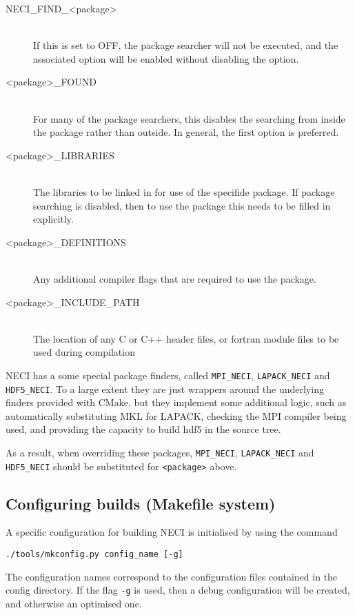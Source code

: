 \documentclass[a4paper,notitlepage]{scrreprt}
\newcommand\codeitem[1]{\needspace{1.5\baselineskip}\item[\textnormal{\ttfamily #1 \nopagebreak}] \hfill \\ \nopagebreak}
\let\code\lstinline
\begin{document}
    \begin{description}
        \codeitem{NECI\_FIND\_<package>}
            If this is set to OFF, the package searcher will not be executed, and the associated
            option will be enabled without disabling the option.
        \codeitem{<package>\_FOUND}
            For many of the package searchers, this disables the searching from inside the package
            rather than outside. In general, the first option is preferred.
        \codeitem{<package>\_LIBRARIES}
            The libraries to be linked in for use of the specifide package. If package searching is
            disabled, then to use the package this needs to be filled in explicitly.
        \codeitem{<package>\_DEFINITIONS}
            Any additional compiler flags that are required to use the package.
        \codeitem{<package>\_INCLUDE\_PATH}
            The location of any C or C++ header files, or fortran module files to be used during
            compilation
    \end{description}

    NECI has a some special package finders, called \code{MPI_NECI}, \code{LAPACK_NECI} and
    \code{HDF5_NECI}. To a large
    extent they are just wrappers around the underlying finders provided with CMake, but they
    implement some additional logic, such as automatically substituting MKL for LAPACK, checking
    the MPI compiler being used, and providing the capacity to build hdf5 in the source tree.

    As a result, when overriding these packages, \code{MPI_NECI}, \code{LAPACK_NECI} and
    \code{HDF5_NECI} should be substituted for \code{<package>} above.

\subsection{Configuring builds (Makefile system)}
	A specific configuration for building NECI is initialised by using the
	command
	\begin{lstlisting}[gobble=4]
		./tools/mkconfig.py config_name [-g]
	\end{lstlisting}
	The configuration names correspond to the configuration files contained in
	the config directory. If the flag \code{-g} is used, then a debug
	configuration will be created, and otherwise an optimised one.
\end{document}
